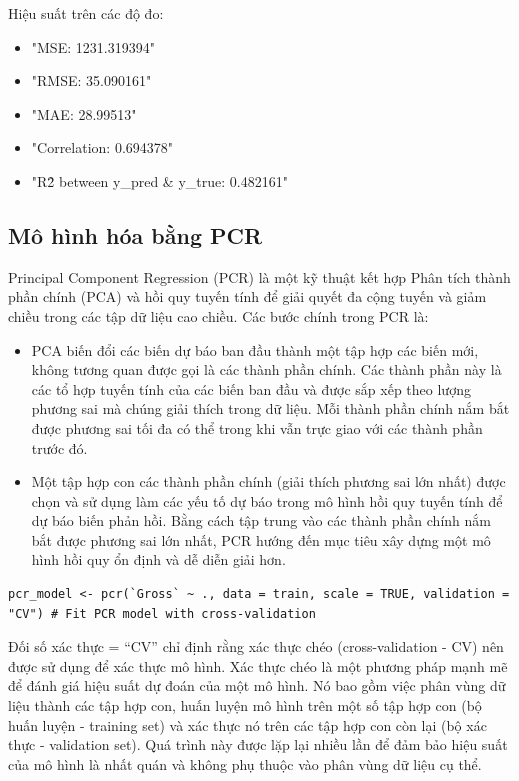 Hiệu suất trên các độ đo:
\begin{itemize}
    \item "MSE: 1231.319394"
    \item "RMSE: 35.090161"
    \item "MAE: 28.99513"
    \item "Correlation: 0.694378"
    \item "R\^2 between y\_pred \& y\_true: 0.482161"
\end{itemize}

\subsection{Mô hình hóa bằng PCR}

Principal Component Regression (PCR) là một kỹ thuật kết hợp Phân tích thành phần chính (PCA) và hồi quy tuyến tính để giải quyết đa cộng tuyến và giảm chiều trong các tập dữ liệu cao chiều. Các bước chính trong PCR là:
\begin{itemize}
    \item PCA biến đổi các biến dự báo ban đầu thành một tập hợp các biến mới, không tương quan được gọi là các thành phần chính. Các thành phần này là các tổ hợp tuyến tính của các biến ban đầu và được sắp xếp theo lượng phương sai mà chúng giải thích trong dữ liệu. Mỗi thành phần chính nắm bắt được phương sai tối đa có thể trong khi vẫn trực giao với các thành phần trước đó.
    \item Một tập hợp con các thành phần chính (giải thích phương sai lớn nhất) được chọn và sử dụng làm các yếu tố dự báo trong mô hình hồi quy tuyến tính để dự báo biến phản hồi. Bằng cách tập trung vào các thành phần chính nắm bắt được phương sai lớn nhất, PCR hướng đến mục tiêu xây dựng một mô hình hồi quy ổn định và dễ diễn giải hơn.
\end{itemize}

\begin{lstlisting}
pcr_model <- pcr(`Gross` ~ ., data = train, scale = TRUE, validation = "CV") # Fit PCR model with cross-validation
\end{lstlisting}

Đối số xác thực = “CV” chỉ định rằng xác thực chéo (cross-validation - CV) nên được sử dụng để xác thực mô hình. Xác thực chéo là một phương pháp mạnh mẽ để đánh giá hiệu suất dự đoán của một mô hình. Nó bao gồm việc phân vùng dữ liệu thành các tập hợp con, huấn luyện mô hình trên một số tập hợp con (bộ huấn luyện - training set) và xác thực nó trên các tập hợp con còn lại (bộ xác thực - validation set). Quá trình này được lặp lại nhiều lần để đảm bảo hiệu suất của mô hình là nhất quán và không phụ thuộc vào phân vùng dữ liệu cụ thể.

